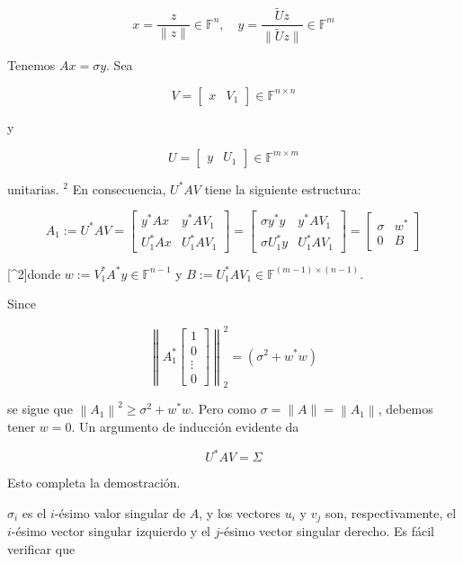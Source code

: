 $$
x=\frac{z}{\|z\|} \in \mathbb{F}^{n}, \quad y=\frac{\tilde{U} z}{\|\tilde{U} z\|} \in \mathbb{F}^{m}
$$

Tenemos $A x=\sigma y$. Sea

$$
V=\left[\begin{array}{ll}
x & V_{1}
\end{array}\right] \in \mathbb{F}^{n \times n}
$$

y

$$
U=\left[\begin{array}{ll}
y & U_{1}
\end{array}\right] \in \mathbb{F}^{m \times m}
$$

unitarias. ${ }^{2}$ En consecuencia, $U^{*} A V$ tiene la siguiente estructura:

$$
A_{1}:=U^{*} A V=\left[\begin{array}{cc}
y^{*} A x & y^{*} A V_{1} \\
U_{1}^{*} A x & U_{1}^{*} A V_{1}
\end{array}\right]=\left[\begin{array}{cc}
\sigma y^{*} y & y^{*} A V_{1} \\
\sigma U_{1}^{*} y & U_{1}^{*} A V_{1}
\end{array}\right]=\left[\begin{array}{cc}
\sigma & w^{*} \\
0 & B
\end{array}\right]
$$

[\^{}2]donde $w:=V_{1}^{*} A^{*} y \in \mathbb{F}^{n-1}$ y $B:=U_{1}^{*} A V_{1} \in \mathbb{F}^{(m-1) \times(n-1)}$.

Since

$$
\left\|A_{1}^{*}\left[\begin{array}{c}
1 \\
0 \\
\vdots \\
0
\end{array}\right]\right\|_{2}^{2}=\left(\sigma^{2}+w^{*} w\right)
$$

se sigue que $\left\|A_{1}\right\|^{2} \geq \sigma^{2}+w^{*} w$. Pero como $\sigma=\|A\|=\left\|A_{1}\right\|$, debemos tener $w=0$. Un argumento de inducción evidente da

$$
U^{*} A V=\Sigma
$$

Esto completa la demostración.

$\sigma_{i}$ es el $i$-ésimo valor singular de $A$, y los vectores $u_{i}$ y $v_{j}$ son, respectivamente, el $i$-ésimo vector singular izquierdo y el $j$-ésimo vector singular derecho. Es fácil verificar que

